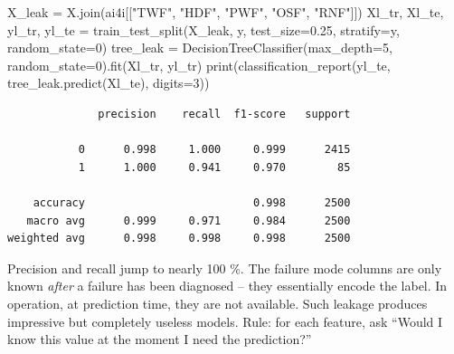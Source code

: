 \documentclass[
  letterpaper,
  DIV=11,
  numbers=noendperiod]{scrreprt}
\newenvironment{Shaded}{\begin{snugshade}}{\end{snugshade}}
\newcommand{\BuiltInTok}[1]{\textcolor[rgb]{0.00,0.23,0.31}{#1}}
\newcommand{\DecValTok}[1]{\textcolor[rgb]{0.68,0.00,0.00}{#1}}
\newcommand{\FloatTok}[1]{\textcolor[rgb]{0.68,0.00,0.00}{#1}}
\newcommand{\NormalTok}[1]{\textcolor[rgb]{0.00,0.23,0.31}{#1}}
\newcommand{\OperatorTok}[1]{\textcolor[rgb]{0.37,0.37,0.37}{#1}}
\newcommand{\StringTok}[1]{\textcolor[rgb]{0.13,0.47,0.30}{#1}}
\begin{document}
\begin{tcolorbox}[enhanced jigsaw, left=2mm, title=\textcolor{quarto-callout-caution-color}{\faFire}\hspace{0.5em}{Solution to Exercise 1}, opacityback=0, breakable, rightrule=.15mm, arc=.35mm, toptitle=1mm, colbacktitle=quarto-callout-caution-color!10!white, opacitybacktitle=0.6, coltitle=black, colframe=quarto-callout-caution-color-frame, bottomrule=.15mm, leftrule=.75mm, bottomtitle=1mm, titlerule=0mm, toprule=.15mm, colback=white]

\begin{Shaded}
\begin{Highlighting}[]
\NormalTok{X\_leak }\OperatorTok{=}\NormalTok{ X.join(ai4i[[}\StringTok{"TWF"}\NormalTok{, }\StringTok{"HDF"}\NormalTok{, }\StringTok{"PWF"}\NormalTok{, }\StringTok{"OSF"}\NormalTok{, }\StringTok{"RNF"}\NormalTok{]])}
\NormalTok{Xl\_tr, Xl\_te, yl\_tr, yl\_te }\OperatorTok{=}\NormalTok{ train\_test\_split(X\_leak, y, test\_size}\OperatorTok{=}\FloatTok{0.25}\NormalTok{, stratify}\OperatorTok{=}\NormalTok{y, random\_state}\OperatorTok{=}\DecValTok{0}\NormalTok{)}
\NormalTok{tree\_leak }\OperatorTok{=}\NormalTok{ DecisionTreeClassifier(max\_depth}\OperatorTok{=}\DecValTok{5}\NormalTok{, random\_state}\OperatorTok{=}\DecValTok{0}\NormalTok{).fit(Xl\_tr, yl\_tr)}
\BuiltInTok{print}\NormalTok{(classification\_report(yl\_te, tree\_leak.predict(Xl\_te), digits}\OperatorTok{=}\DecValTok{3}\NormalTok{))}
\end{Highlighting}
\end{Shaded}

\begin{verbatim}
              precision    recall  f1-score   support

           0      0.998     1.000     0.999      2415
           1      1.000     0.941     0.970        85

    accuracy                          0.998      2500
   macro avg      0.999     0.971     0.984      2500
weighted avg      0.998     0.998     0.998      2500
\end{verbatim}

Precision and recall jump to nearly 100 \%. The failure mode columns are
only known \emph{after} a failure has been diagnosed -- they essentially
encode the label. In operation, at prediction time, they are not
available. Such leakage produces impressive but completely useless
models. Rule: for each feature, ask ``Would I know this value at the
moment I need the prediction?''

\end{tcolorbox}
\end{document}
